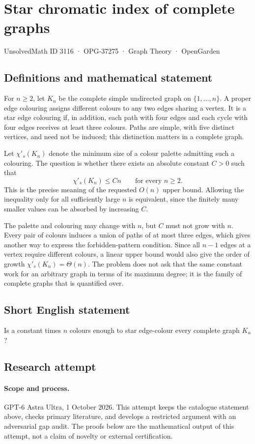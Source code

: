 \documentclass[11pt,a4paper]{article}
\begin{document}
\section*{Star chromatic index of complete graphs}\label{3116}
{\small UnsolvedMath ID 3116 · OPG-37275 · Graph Theory · OpenGarden}
\subsection{Definitions and mathematical statement}
For $n\ge2$, let $K_n$ be the complete simple undirected graph on
$\{1,\ldots,n\}$. A proper edge colouring assigns different colours to
any two edges sharing a vertex. It is a star edge colouring if, in
addition, each path with four edges and each cycle with four edges
receives at least three colours. Paths are simple, with five distinct
vertices, and need not be induced; this distinction matters in a
complete graph.

Let $\chi'_s(K_n)$ denote the minimum size of a colour palette admitting
such a colouring. The question is whether there exists an absolute
constant $C>0$ such that
\[
 \chi'_s(K_n)\le Cn\qquad\text{for every }n\ge2.
\]
This is the precise meaning of the requested $O(n)$ upper bound.
Allowing the inequality only for all sufficiently large $n$ is equivalent,
since the finitely many smaller values can be absorbed by increasing $C$.

The palette and colouring may change with $n$, but $C$ must not grow
with $n$. Every pair of colours induces a union of paths of at most
three edges, which gives another way to express the forbidden-pattern
condition. Since all $n-1$ edges at a vertex require different colours,
a linear upper bound would also give the order of growth
$\chi'_s(K_n)=\Theta(n)$.
The problem does not ask that the same constant work for an arbitrary
graph in terms of its maximum degree; it is the family of complete
graphs that is quantified over.
\subsection{Short English statement}
Is a constant times $n$ colours enough to star edge-colour every complete graph $K_n$?
\subsection{Research attempt}
\paragraph{Scope and process.}
GPT-6 Astra Ultra, 1 October 2026. This attempt keeps the catalogue statement above, checks primary literature, and develops a restricted argument with an adversarial gap audit. The proofs below are the mathematical output of this attempt, not a claim of novelty or external certification.
\end{document}
